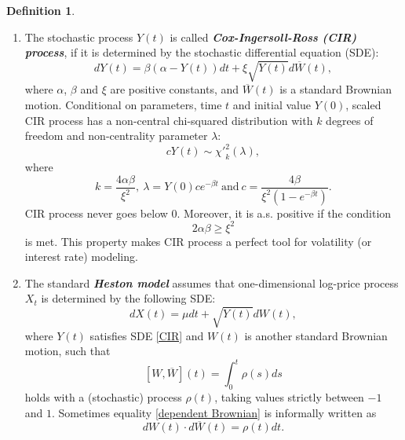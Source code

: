 \documentclass[a4paper,11pt]{article}
\theoremstyle{plain}
\theoremstyle{definition}
\newtheorem{defn}[thm]{Definition}
\newcommand{\define}[1]{\textit{\textbf{#1}}}
\begin{document}
    \begin{defn} \
    	\begin{enumerate}
    		\item 
    		The stochastic process $Y(t)$ is called \define{Cox-Ingersoll-Ross (CIR) process}, if it is determined by the stochastic differential equation (SDE):
    		\begin{equation} \label{CIR}
    		dY(t) = \beta(\alpha - Y(t))dt + \xi\sqrt{Y(t)}d \overline{W}(t),
    		\end{equation}
    		where $\alpha$, $\beta$ and $\xi$ are positive constants, and $\overline{W}(t)$ is a standard Brownian motion. Conditional on parameters, time $t$ and initial value $Y(0)$, scaled CIR process has a non-central chi-squared distribution with $k$ degrees of freedom and non-centrality parameter $\lambda$:
    		\[ c Y(t) \sim {\chi'}_k^2(\lambda),  \]
    		where
    		\[k = \frac{4\alpha \beta}{\xi^2},\ \lambda = Y(0) c e^{-\beta t} \ \text{and} \ c = \frac{4 \beta}{\xi^2 (1-e^{-\beta t})}.\]
    		CIR process never goes below $0$. Moreover, it is a.s. positive if the condition
    		\[ 2\alpha \beta \geq \xi^2  \]
    		is met. This property makes CIR process a perfect tool for volatility (or interest rate) modeling.
    		\item The standard \define{Heston model} assumes that one-dimensional log-price process $X_t$ is determined by the following SDE:
    		\begin{equation}
    		dX(t) = \mu dt + \sqrt{Y(t)}d{W}(t),
    		\end{equation}
    		where $Y(t)$ satisfies SDE \eqref{CIR} and ${W}(t)$ is another standard Brownian motion, such that 
    		\begin{equation} \label{dependent Brownian}
    		[{W}, \overline{W}](t) = \int_{0}^{t}\rho(s) ds
    		\end{equation}
    		holds with a (stochastic) process $\rho(t)$, taking values strictly between $-1$ and $1$. Sometimes equality \eqref{dependent Brownian} is informally written as
    		\[ d{W}(t)\cdot d\overline{W}(t) = \rho(t) dt. \]
    	\end{enumerate}
    \end{defn}
    
\end{document}
